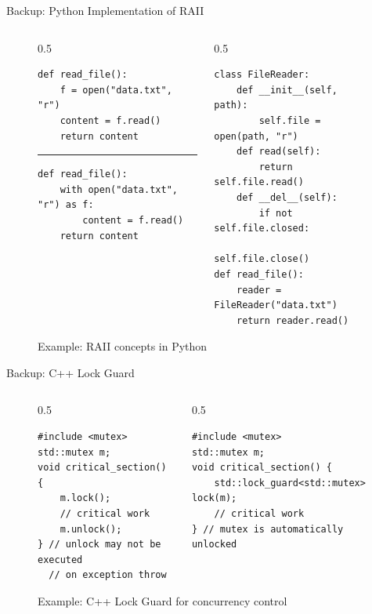 \begin{frame}[fragile]{Backup: Python Implementation of RAII}
	\begin{figure}
		\centering
		\begin{columns}[T,onlytextwidth]
			\begin{column}{0.5\textwidth}
				\begin{verbatim}
def read_file():
    f = open("data.txt", "r")
    content = f.read()
    return content
		\end{verbatim}
				\rule{\linewidth}{0.5mm}
				\begin{verbatim}
def read_file():
    with open("data.txt", "r") as f:
        content = f.read()
    return content
				\end{verbatim}
			\end{column}
			\begin{column}{0.5\textwidth}
				\begin{verbatim}
class FileReader:
    def __init__(self, path):
        self.file = open(path, "r")
    def read(self):
        return self.file.read()
    def __del__(self):
        if not self.file.closed:
            self.file.close()
def read_file():
    reader = FileReader("data.txt")
    return reader.read()
				\end{verbatim}
			\end{column}
		\end{columns}
		\caption{Example: RAII concepts in Python}
	\end{figure}
\end{frame}

\begin{frame}[fragile]{Backup: C++ Lock Guard}
	\begin{figure}
		\centering
		\begin{columns}[T,onlytextwidth]
			\begin{column}{0.5\textwidth}
				\begin{verbatim}
#include <mutex>
std::mutex m;
void critical_section() {
	m.lock();
	// critical work
	m.unlock();
} // unlock may not be executed
  // on exception throw
				\end{verbatim}
			\end{column}
			\begin{column}{0.5\textwidth}
				\begin{verbatim}
#include <mutex>
std::mutex m;
void critical_section() {
    std::lock_guard<std::mutex> lock(m);
    // critical work
} // mutex is automatically unlocked
				\end{verbatim}
			\end{column}
		\end{columns}
		\caption{Example: C++ Lock Guard for concurrency control}
	\end{figure}
\end{frame}

